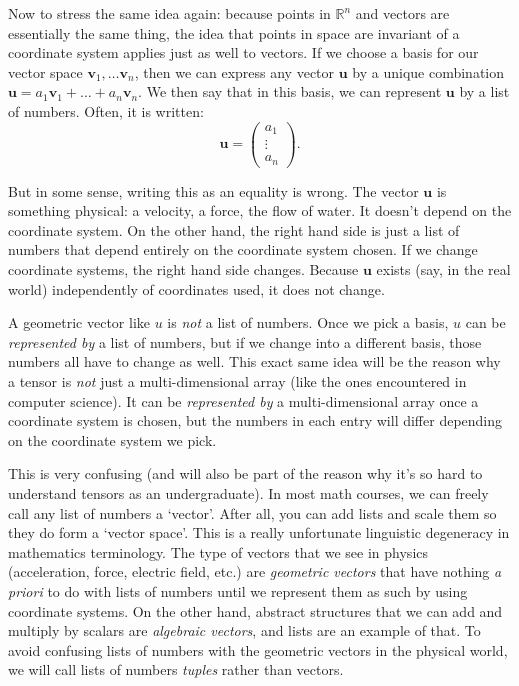 \documentclass[../master.tex]{subfiles}
\begin{document}
	Now to stress the same idea again: because points in $\mathbb R^n$ and vectors are essentially the same thing, the idea that points in space are invariant of a coordinate system applies just as well to vectors. If we choose a basis for our vector space $\mathbf v_1, \dots \mathbf v_n$, then we can express any vector $\mathbf u$ by a unique combination $\mathbf u = a_1 \mathbf v_1 + \dots + a_n \mathbf v_n$. We then say that in this basis, we can represent $\mathbf u$ by a list of numbers. Often, it is written:
	\begin{equation*}
		\mathbf u = \begin{pmatrix} a_1 \\ \vdots \\a_n	\end{pmatrix}.
	\end{equation*}
	
	But in some sense, writing this as an equality is wrong. The vector $\mathbf u$ is something physical: a velocity, a force, the flow of water. It doesn't depend on the coordinate system. On the other hand, the right hand side is just a list of numbers that depend entirely on the coordinate system chosen. If we change coordinate systems, the right hand side changes. Because $\mathbf u$ exists (say, in the real world) independently of coordinates used, it does not change.
	
	A geometric vector like $u$ is \emph{not} a list of numbers. Once we pick a basis, $u$ can be \emph{represented by} a list of numbers, but if we change into a different basis, those numbers all have to change as well. This exact same idea will be the reason why a tensor is \emph{not} just a multi-dimensional array (like the ones encountered in computer science). It can be \emph{represented by} a multi-dimensional array once a coordinate system is chosen, but the numbers in each entry will differ depending on the coordinate system we pick. 
	
	This is very confusing (and will also be part of the reason why it's so hard to understand tensors as an undergraduate). In most math courses, we can freely call any list of numbers a `vector'. After all, you can add lists and scale them so they do form a `vector space'. This is a really unfortunate linguistic degeneracy in mathematics terminology. The type of vectors that we see in physics (acceleration, force, electric field, etc.) are \emph{geometric vectors} that have nothing \emph{a priori} to do with lists of numbers until we represent them as such by using coordinate systems. On the other hand, abstract structures that we can add and multiply by scalars are \emph{algebraic vectors}, and lists are an example of that. To avoid confusing lists of numbers with the geometric vectors in the physical world, we will call lists of numbers \emph{tuples} rather than vectors.
	
\end{document}
